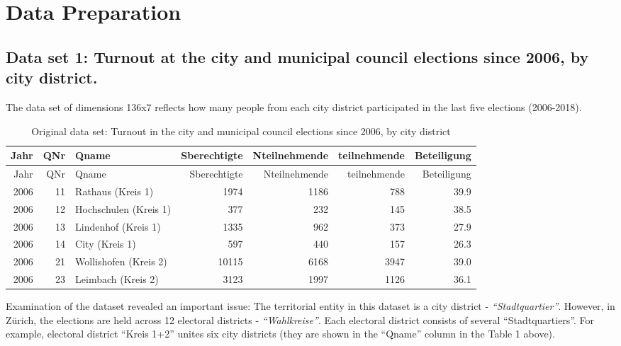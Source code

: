\documentclass[
]{article}
\begin{document}
\pagebreak

\hypertarget{data-preparation}{%
\section{Data Preparation}\label{data-preparation}}

\hypertarget{data-set-1-turnout-at-the-city-and-municipal-council-elections-since-2006-by-city-district.}{%
\subsection{Data set 1: Turnout at the city and municipal council
elections since 2006, by city
district.}\label{data-set-1-turnout-at-the-city-and-municipal-council-elections-since-2006-by-city-district.}}

The data set of dimensions 136x7 reflects how many people from each city
district participated in the last five elections (2006-2018).

\begin{longtable}[]{@{}rrlrrrr@{}}
\caption{Original data set: Turnout in the city and municipal council
elections since 2006, by city district}\tabularnewline
\toprule
Jahr & QNr & Qname & Sberechtigte & Nteilnehmende & teilnehmende &
Beteiligung \\
\midrule
\endfirsthead
\toprule
Jahr & QNr & Qname & Sberechtigte & Nteilnehmende & teilnehmende &
Beteiligung \\
\midrule
\endhead
2006 & 11 & Rathaus (Kreis 1) & 1974 & 1186 & 788 & 39.9 \\
2006 & 12 & Hochschulen (Kreis 1) & 377 & 232 & 145 & 38.5 \\
2006 & 13 & Lindenhof (Kreis 1) & 1335 & 962 & 373 & 27.9 \\
2006 & 14 & City (Kreis 1) & 597 & 440 & 157 & 26.3 \\
2006 & 21 & Wollishofen (Kreis 2) & 10115 & 6168 & 3947 & 39.0 \\
2006 & 23 & Leimbach (Kreis 2) & 3123 & 1997 & 1126 & 36.1 \\
\bottomrule
\end{longtable}

Examination of the dataset revealed an important issue: The territorial
entity in this dataset is a city district - \emph{``Stadtquartier''}.
However, in Zürich, the elections are held across 12 electoral districts
- \emph{``Wahlkreise''}. Each electoral district consists of several
``Stadtquartiers''. For example, electoral district ``Kreis 1+2'' unites
six city districts (they are shown in the ``Qname'' column in the Table
1 above).
\end{document}

